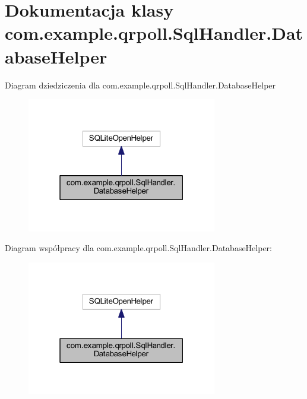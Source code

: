 \hypertarget{classcom_1_1example_1_1qrpoll_1_1_sql_handler_1_1_database_helper}{\section{Dokumentacja klasy com.\+example.\+qrpoll.\+Sql\+Handler.\+Database\+Helper}
\label{classcom_1_1example_1_1qrpoll_1_1_sql_handler_1_1_database_helper}
}


Diagram dziedziczenia dla com.\+example.\+qrpoll.\+Sql\+Handler.\+Database\+Helper\nopagebreak
\begin{figure}[H]
\begin{center}
\leavevmode
\includegraphics[width=235pt]{classcom_1_1example_1_1qrpoll_1_1_sql_handler_1_1_database_helper__inherit__graph}
\end{center}
\end{figure}


Diagram współpracy dla com.\+example.\+qrpoll.\+Sql\+Handler.\+Database\+Helper\+:\nopagebreak
\begin{figure}[H]
\begin{center}
\leavevmode
\includegraphics[width=235pt]{classcom_1_1example_1_1qrpoll_1_1_sql_handler_1_1_database_helper__coll__graph}
\end{center}
\end{figure}
